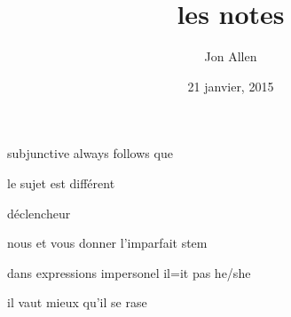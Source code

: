 \documentclass[letterpaper]{article}
\begin{document}
\title{les notes}
\date{21 janvier, 2015}
\author{Jon Allen}
\maketitle
subjunctive always follows que

le sujet est différent

déclencheur

nous et vous donner l'imparfait stem

dans expressions impersonel il=it pas he/she

il vaut mieux qu'il se rase
\end{document}

